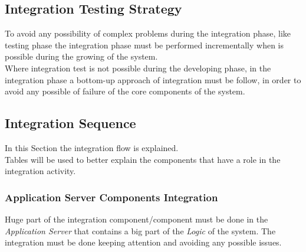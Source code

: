 \subsection{Integration Testing Strategy}
To avoid any possibility of complex problems during the integration phase, like testing phase the integration phase must be performed incrementally when is possible during the growing of the system.\\
Where integration test is not possible during the developing phase, in the integration phase a bottom-up approach of integration must be follow, in order to avoid any possible of failure of the core components of the system.

\subsection{Integration Sequence}
In this Section the integration flow is explained.\\
Tables will be used to better explain the components that have a role in the integration activity.

\subsubsection{Application Server Components Integration}\label{appServCompIntRef}
Huge part of the integration component/component must be done in the \textit{Application Server} that contains a big part of the \textit{Logic} of the system. The integration must be done keeping attention and avoiding any possible issues.


